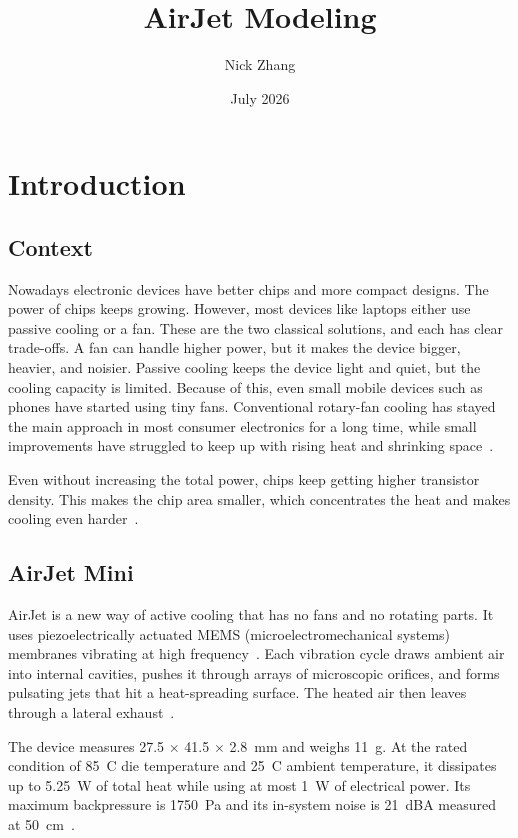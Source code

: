 \documentclass[11pt]{article}
\title{AirJet Modeling}
\author{Nick Zhang}
\date{July 2026}
\begin{document}
\maketitle
\tableofcontents
\newpage

\section{Introduction}

\subsection{Context}

Nowadays electronic devices have better chips and more compact designs.
The power of chips keeps growing. However, most devices like laptops
either use passive cooling or a fan. These are the two classical
solutions, and each has clear trade-offs. A fan can handle higher power,
but it makes the device bigger, heavier, and noisier. Passive cooling
keeps the device light and quiet, but the cooling capacity is limited.
Because of this, even small mobile devices such as phones have started
using tiny fans. Conventional rotary-fan cooling has stayed the main
approach in most consumer electronics for a long time, while small
improvements have struggled to keep up with rising heat and shrinking
space~\cite{wang2013thermal}.

Even without increasing the total power, chips keep getting higher
transistor density. This makes the chip area smaller, which concentrates
the heat and makes cooling even harder~\cite{moore2014emerging}.

\subsection{AirJet Mini}

AirJet is a new way of active cooling that has no fans and no rotating
parts. It uses piezoelectrically actuated MEMS (microelectromechanical
systems) membranes vibrating at high frequency~\cite{hot_chips_2024}.
Each vibration cycle draws ambient air into internal cavities, pushes
it through arrays of microscopic orifices, and forms pulsating jets that
hit a heat-spreading surface. The heated air then leaves through a
lateral exhaust~\cite{frore_datasheet}.

The device measures 27.5 $\times$ 41.5 $\times$ 2.8~mm and weighs 11~g.
At the rated condition of 85~\textdegree{}C die temperature and
25~\textdegree{}C ambient temperature, it dissipates up to 5.25~W of
total heat while using at most 1~W of electrical power. Its maximum
backpressure is 1750~Pa and its in-system noise is 21~dBA measured at
50~cm~\cite{frore_datasheet}.
\end{document}
